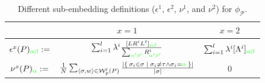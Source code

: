 \begin{table}[!t]
\begin{tabular}{l|l|l|l|l|l|l|}
		\bottomrule
	\end{tabular}
\end{table}  \begin{table}[!t]
\caption{Different sub-embedding definitions ($\epsilon^1$, $\epsilon^2$, $\nu^1$, and $\nu^2$) for $\phi_{\mathcal{P}}$.}\label{tab:embedstrat}
\centering
\begin{tabular}{c|c|c}
	\toprule
	& $x=1$ & $x=2$ \\
	\midrule
	$\epsilon^x(P)_{\color{green}\alpha\beta}:=$ & $\label{eq:epsilon}
	\sum_{i=1}^l{\lambda^i}\frac{[LR^iL^t]_{\color{green}\alpha\beta}}{\sum_{\color{green}\alpha'\beta'}R^i_{\color{green}\alpha'\beta'}}$ & $
	\sum_{i=1}^l\lambda^i[\Lambda^i]_{\color{green}\alpha\beta}$\\
	$\nu^x(P)_{\color{green}\alpha}:=$ & $\frac{1}{N}\sum_{\braket{\sigma,w}\in\mathcal{W}_p^l(P)}\frac{|\Set{\sigma_i\in\sigma|\sigma_i\neq\tau\wedge \sigma_i={\color{green}\alpha}}|}{|\sigma|}$ & $0$ \\
	\bottomrule
\end{tabular}
\end{table} 
